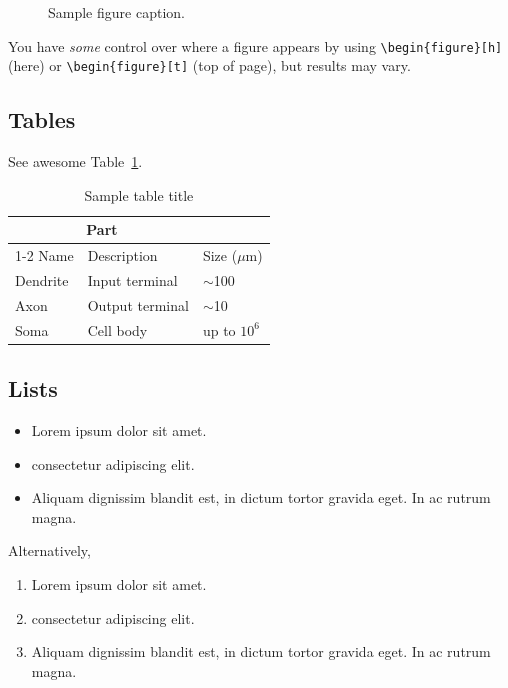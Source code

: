 \documentclass[12pt,a4paper]{article}
\theoremstyle{definition}
\begin{document}
\begin{figure}[t!]
  \centering
  \fbox{\rule[-.5cm]{4cm}{4cm} \rule[-.5cm]{4cm}{0cm}}
  \caption{Sample figure caption.}
  \label{fig:fig1}
\end{figure}

You have {\em some} control over where a figure appears by using \verb+\begin{figure}[h]+ (here) or  \verb+\begin{figure}[t]+ (top of page), but results may vary.

\subsection{Tables}
\lipsum[12]
See awesome Table~\ref{tab:table}.

\begin{table}
 \caption{Sample table title}
  \centering
  \begin{tabular}{lll}
    \toprule
    \multicolumn{2}{c}{Part}                   \\
    \cmidrule(r){1-2}
    Name     & Description     & Size ($\mu$m) \\
    \midrule
    Dendrite & Input terminal  & $\sim$100     \\
    Axon     & Output terminal & $\sim$10      \\
    Soma     & Cell body       & up to $10^6$  \\
    \bottomrule
  \end{tabular}
  \label{tab:table}
\end{table}

\subsection{Lists}
\begin{itemize}
\item Lorem ipsum dolor sit amet.
\item consectetur adipiscing elit. 
\item Aliquam dignissim blandit est, in dictum tortor gravida eget. In ac rutrum magna.
\end{itemize}
Alternatively, 
\begin{enumerate}
	\item Lorem ipsum dolor sit amet.
	\item consectetur adipiscing elit. 
	\item Aliquam dignissim blandit est, in dictum tortor gravida eget. In ac rutrum magna.
\end{enumerate}
\end{document}
